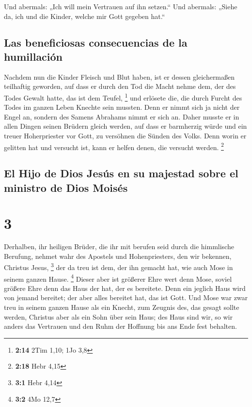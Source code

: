  Und abermals: „Ich will mein Vertrauen auf ihn setzen.``
Und abermals: „Siehe da, ich und die Kinder, welche mir Gott gegeben
hat.``

\hypertarget{las-beneficiosas-consecuencias-de-la-humillaciuxf3n}{%
\subsection{Las beneficiosas consecuencias de la
humillación}\label{las-beneficiosas-consecuencias-de-la-humillaciuxf3n}}

 Nachdem nun die Kinder Fleisch und Blut haben, ist er
dessen gleichermaßen teilhaftig geworden, auf dass er durch den Tod die
Macht nehme dem, der des Todes Gewalt hatte, das ist dem Teufel,
\footnote{\textbf{2:14} 2Tim 1,10; 1Jo 3,8}  und erlösete
die, die durch Furcht des Todes im ganzen Leben Knechte sein mussten.
 Denn er nimmt sich ja nicht der Engel an, sondern des
Samens Abrahams nimmt er sich an.  Daher musste er in
allen Dingen seinen Brüdern gleich werden, auf dass er barmherzig würde
und ein treuer Hoherpriester vor Gott, zu versöhnen die Sünden des
Volks.  Denn worin er gelitten hat und versucht ist, kann
er helfen denen, die versucht werden. \footnote{\textbf{2:18} Hebr 4,15}

\hypertarget{el-hijo-de-dios-jesuxfas-en-su-majestad-sobre-el-ministro-de-dios-moisuxe9s}{%
\subsection{El Hijo de Dios Jesús en su majestad sobre el ministro de
Dios
Moisés}\label{el-hijo-de-dios-jesuxfas-en-su-majestad-sobre-el-ministro-de-dios-moisuxe9s}}

\hypertarget{section-2}{%
\section{3}\label{section-2}}

 Derhalben, ihr heiligen Brüder, die ihr mit berufen seid
durch die himmlische Berufung, nehmet wahr des Apostels und
Hohenpriesters, den wir bekennen, Christus Jesus, \footnote{\textbf{3:1}
  Hebr 4,14}  der da treu ist dem, der ihn gemacht hat,
wie auch Mose in seinem ganzen Hause. \footnote{\textbf{3:2} 4Mo 12,7}
 Dieser aber ist größerer Ehre wert denn Mose, soviel
größere Ehre denn das Haus der hat, der es bereitete. 
Denn ein jeglich Haus wird von jemand bereitet; der aber alles bereitet
hat, das ist Gott.  Und Mose war zwar treu in seinem
ganzen Hause als ein Knecht, zum Zeugnis des, das gesagt sollte werden,
 Christus aber als ein Sohn über sein Haus; des Haus sind
wir, so wir anders das Vertrauen und den Ruhm der Hoffnung bis ans Ende
fest behalten.

